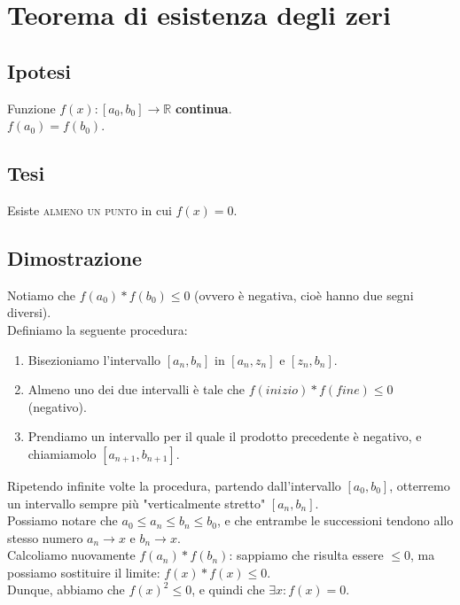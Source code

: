 \documentclass{article}
\begin{document}
\newpage

\section{Teorema di esistenza degli zeri}

\begin{multicols}{2}
    \subsection{Ipotesi}
    Funzione \(f(x) : [a_0, b_0] \to \mathbb{R}\) \textbf{continua}.\\
    \(f(a_0) = f(b_0)\).
\columnbreak
    \subsection{Tesi}
    Esiste \textsc{almeno un punto} in cui \(f(x) = 0\).
\end{multicols}

\subsection{Dimostrazione}

Notiamo che \(f(a_0) * f(b_0) \leq 0\) (ovvero è negativa, cioè hanno due segni diversi).\\
Definiamo la seguente procedura:
\begin{enumerate}
    \item Bisezioniamo l'intervallo \([a_n, b_n]\) in \([a_n, z_n]\) e \([z_n, b_n]\).
    \item Almeno uno dei due intervalli è tale che \(f(inizio) * f(fine) \leq 0\) (negativo).
    \item Prendiamo un intervallo per il quale il prodotto precedente è negativo, e chiamiamolo \([a_{n+1}, b_{n+1}]\).
\end{enumerate}
Ripetendo infinite volte la procedura, partendo dall'intervallo \([a_0, b_0]\), otterremo un intervallo sempre più "verticalmente stretto" \([a_n, b_n]\).\\
Possiamo notare che \(a_0 \leq a_n \leq b_n \leq b_0\), e che entrambe le successioni tendono allo stesso numero \(a_n \to x\) e \(b_n \to x\).\\
Calcoliamo nuovamente \(f(a_n) * f(b_n)\): sappiamo che risulta essere \(\leq 0\), ma possiamo sostituire il limite: \(f(x) * f(x) \leq 0\).\\
Dunque, abbiamo che \(f(x)^2 \leq 0\), e quindi che \(\exists x : f(x) = 0\).
\end{document}
